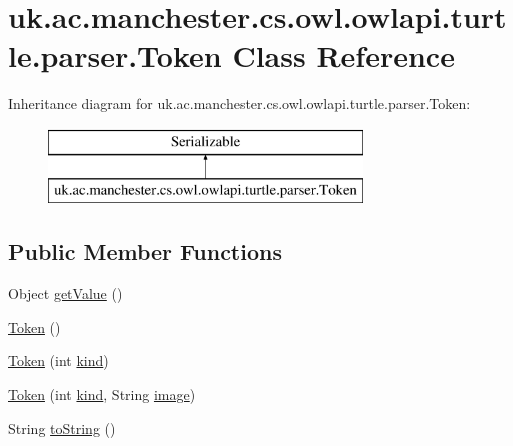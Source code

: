 \hypertarget{classuk_1_1ac_1_1manchester_1_1cs_1_1owl_1_1owlapi_1_1turtle_1_1parser_1_1_token}{\section{uk.\-ac.\-manchester.\-cs.\-owl.\-owlapi.\-turtle.\-parser.\-Token Class Reference}
\label{classuk_1_1ac_1_1manchester_1_1cs_1_1owl_1_1owlapi_1_1turtle_1_1parser_1_1_token}
}
Inheritance diagram for uk.\-ac.\-manchester.\-cs.\-owl.\-owlapi.\-turtle.\-parser.\-Token\-:\begin{figure}[H]
\begin{center}
\leavevmode
\includegraphics[height=2.000000cm]{classuk_1_1ac_1_1manchester_1_1cs_1_1owl_1_1owlapi_1_1turtle_1_1parser_1_1_token}
\end{center}
\end{figure}
\subsection*{Public Member Functions}
\begin{DoxyCompactItemize}
\item 
Object \hyperlink{classuk_1_1ac_1_1manchester_1_1cs_1_1owl_1_1owlapi_1_1turtle_1_1parser_1_1_token_a4fcd2e05f4b1dc16f0db878b586f5b6b}{get\-Value} ()
\item 
\hyperlink{classuk_1_1ac_1_1manchester_1_1cs_1_1owl_1_1owlapi_1_1turtle_1_1parser_1_1_token_a9baf33452904d3cea1383f9a6f2b5ec8}{Token} ()
\item 
\hyperlink{classuk_1_1ac_1_1manchester_1_1cs_1_1owl_1_1owlapi_1_1turtle_1_1parser_1_1_token_a8ff51104db86d3b718ce736ae828144f}{Token} (int \hyperlink{classuk_1_1ac_1_1manchester_1_1cs_1_1owl_1_1owlapi_1_1turtle_1_1parser_1_1_token_a182c3d2a55ba805842defbe46bc2158c}{kind})
\item 
\hyperlink{classuk_1_1ac_1_1manchester_1_1cs_1_1owl_1_1owlapi_1_1turtle_1_1parser_1_1_token_a908f20e89a435a2d3765956c13433a23}{Token} (int \hyperlink{classuk_1_1ac_1_1manchester_1_1cs_1_1owl_1_1owlapi_1_1turtle_1_1parser_1_1_token_a182c3d2a55ba805842defbe46bc2158c}{kind}, String \hyperlink{classuk_1_1ac_1_1manchester_1_1cs_1_1owl_1_1owlapi_1_1turtle_1_1parser_1_1_token_a25ac3290c1591ce7f1c7c01519cf3802}{image})
\item 
String \hyperlink{classuk_1_1ac_1_1manchester_1_1cs_1_1owl_1_1owlapi_1_1turtle_1_1parser_1_1_token_a12495b32d9d79ea82492f803a210c3a5}{to\-String} ()
\end{DoxyCompactItemize}
